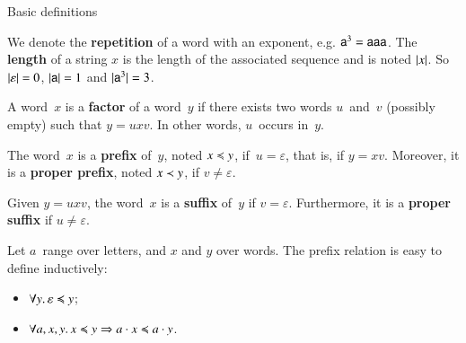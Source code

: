 %
\begin{frame}{Basic definitions}

We denote the \textbf{repetition} of a word with an exponent, e.g.
\(\textsf{a}^3 = \textsf{aaa}\). The \textbf{length} of a string \(x\) is
the length of the associated sequence and is noted \(\left\lvert\smash{x}\right\rvert\). So
\(\left\lvert\smash{\varepsilon}\right\rvert = 0\), \(\left\lvert\smash{\textsf{a}}\right\rvert = 1\) and
\(\left\lvert\smash{\textsf{a}^3}\right\rvert = 3\).

\bigskip

A word~\(x\) is a \textbf{factor} of a word~\(y\) if there exists two
words \(u\)~and~\(v\) (possibly empty) such that \(y = uxv\). In other
words, \(u\)~occurs in~\(y\).

\bigskip

The word~\(x\) is a \textbf{prefix} of~\(y\), noted \(x \mathrel{\preccurlyeq} y\),
if~\(u=\varepsilon\), that is, if \(y = xv\). Moreover, it is a
\textbf{proper prefix}, noted \(x \mathrel{\prec} y\), if \(v \neq \varepsilon\).

\bigskip

Given \(y = uxv\), the word~\(x\) is a \textbf{suffix} of~\(y\) if \(v
= \varepsilon\). Furthermore, it is a \textbf{proper suffix} if \(u
\neq \varepsilon\).

\bigskip

Let \(a\)~range over letters, and \(x\) and \(y\) over words. The
prefix relation is easy to define inductively:
\begin{itemize}

  \item \(\forall y. \, \varepsilon \mathrel{\preccurlyeq} y\);

  \item \(\forall a, x, y. \, x \mathrel{\preccurlyeq} y \Rightarrow a \cdot x \mathrel{\preccurlyeq} a
    \cdot y\).

\end{itemize}

\end{frame}

